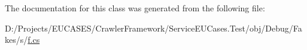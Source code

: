 The documentation for this class was generated from the following file\-:\begin{DoxyCompactItemize}
\item 
D\-:/\-Projects/\-E\-U\-C\-A\-S\-E\-S/\-Crawler\-Framework/\-Service\-E\-U\-Cases.\-Test/obj/\-Debug/\-Fakes/s/\hyperlink{s_2f_8cs}{f.\-cs}\end{DoxyCompactItemize}
